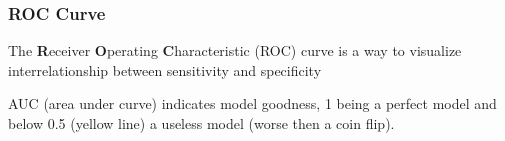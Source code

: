\documentclass[compress]{beamer}
\begin{document}
\begin{frame}
	\frametitle{ROC Curve}
	
	The \textbf{R}eceiver \textbf{O}perating \textbf{C}haracteristic (ROC) curve is a way to visualize 
	interrelationship between sensitivity and specificity
	
		\begin{figure}
			\centering
			\label{fig:ROC}
		\end{figure}
	
	AUC (area under curve) indicates model goodness, 1 being a perfect model 
	and below 0.5 (yellow line) a useless model (worse then a coin flip).
	
	
\end{frame}
\end{document}
